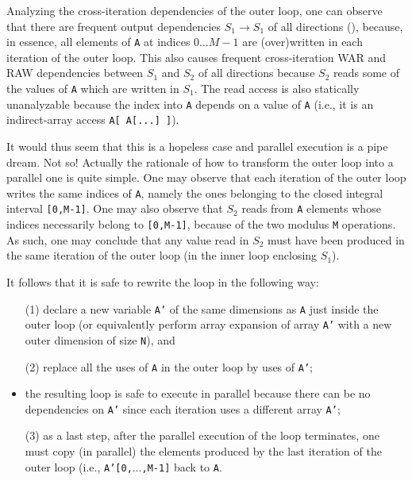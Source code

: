 \documentclass[acmsmall,review]{acmart}\settopmatter{printfolios=true,printccs=false,printacmref=false}
\begin{document}
Analyzing the cross-iteration dependencies of the outer loop,
one can observe that there are frequent output dependencies
$S_1\to S_1$ of all directions ({\tt *}), because, in 
essence, all elements of {\tt A} at indices $0\ldots M-1$
are (over)written in each iteration of the outer loop.
This also causes frequent cross-iteration WAR and RAW 
dependencies between $S_1$ and $S_2$ of all directions
{\tt *} because $S_2$ reads some of the values of 
{\tt A} which are written in $S_1$. The read access
is also statically unanalyzable because the index
into {\tt A} depends on a value of {\tt A} (i.e., 
it is an indirect-array access {\tt A[ A[...] ]}).  

It would thus seem that this is a hopeless case and parallel
execution is a pipe dream. Not so! Actually the rationale
of how to transform the outer loop into a parallel one
is quite simple.  One may observe that each iteration of
the outer loop writes the same indices of {\tt A}, namely
the ones belonging to the closed integral interval 
{\tt [0,M-1]}.   One may also observe that $S_2$ reads 
from {\tt A} elements whose indices necessarily belong to 
{\tt [0,M-1]}, because of the two modulus {\tt M}
operations. As such, one may conclude that any value
read in $S_2$ must have been produced in the same iteration
of the outer loop (in the inner loop enclosing $S_1$).

It follows that it is safe to rewrite the loop in the
following way:
\begin{itemize}
    \item[(1)] declare a new variable {\tt A'} of the same dimensions 
        as {\tt A} just inside the outer loop (or equivalently 
        perform array expansion of array {\tt A'} with a new outer
        dimension of size {\tt N}), and
    \item[(2)] replace all the uses of {\tt A} in the outer loop by
        uses of {\tt A'};
    \item the resulting loop is safe to execute in parallel
        because there can be no dependencies on {\tt A'} since
        each iteration uses a different array {\tt A'};
    \item[(3)] as a last step, after the parallel execution of
        the loop terminates, one must copy (in parallel)
        the elements produced by the last iteration of 
        the outer loop (i.e., {\tt A'[0,$\ldots$,M-1]} 
        back to {\tt A}.
\end{itemize}
\end{document}
